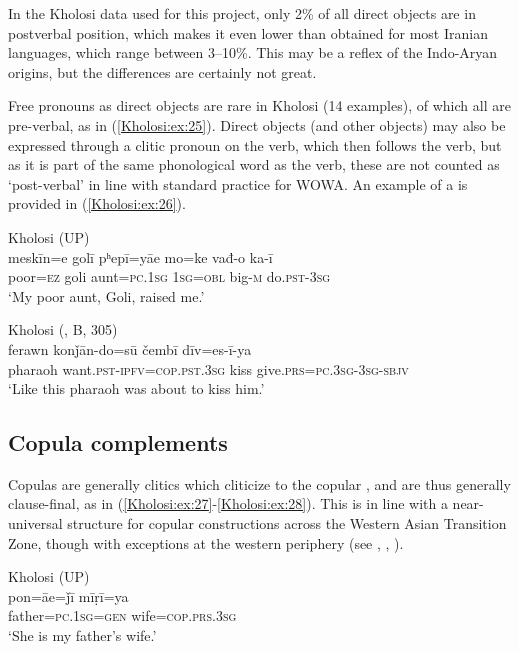 \documentclass[output=paper,colorlinks,citecolor=brown]{langscibook}
\begin{document}
In the Kholosi data used for this project, only 2\% of all direct objects are in postverbal position, which makes it even lower than obtained for most Iranian languages, which range between 3--10\%. This may be a reflex of the Indo-Aryan origins, but the differences are certainly not great.

Free pronouns as direct objects are rare in Kholosi (14 examples), of which all are pre-verbal, as in (\ref{Kholosi:ex:25}). Direct objects (and other objects) may also be expressed through a clitic pronoun on the verb, which then follows the verb, but as it is part of the same phonological word as the verb, these are not counted as `post-verbal' in line with standard practice for WOWA. An example of a   is provided in (\ref{Kholosi:ex:26}).

\ea\label{Kholosi:ex:25}
Kholosi (UP)\\
\gll meskīn=e golī pʰepī=yāe mo=ke vađ-o ka-ī \\
poor\textsc{=ez} goli aunt\textsc{=pc.1sg} \textsc{1sg=obl} big\textsc{-m} do\textsc{.pst-3sg} \\
\glt `My poor aunt, Goli, raised me.' 
\z

\ea\label{Kholosi:ex:26}
Kholosi (\citealt{nourzaei_kholosi_2022}, B, 305)\\
\gll ferawn konǰān-do=sū čembī dīv=es-ī-ya \\
pharaoh want\textsc{.pst-ipfv=cop.pst.3sg} kiss give\textsc{.prs=pc.3sg-3sg-sbjv} \\
\glt `Like this pharaoh was about to kiss him.' 
\z

\subsection{Copula complements}\label{Kholosi:ss:4.2}

Copulas are generally clitics which cliticize to the copular , and are thus generally clause-final, as in (\ref{Kholosi:ex:27}-\ref{Kholosi:ex:28}). This is in line with a near-universal structure for copular constructions across the Western Asian Transition Zone, though with exceptions at the western periphery (see \citealt{haig_introduction_2018}, , ).

\ea\label{Kholosi:ex:27}
Kholosi (UP)\\
\gll pon=āe=ǰī mīṛī=ya \\
father\textsc{=pc.1sg=gen} wife\textsc{=cop.prs.3sg} \\
\glt `She is my father's wife.'
\z
\end{document}
